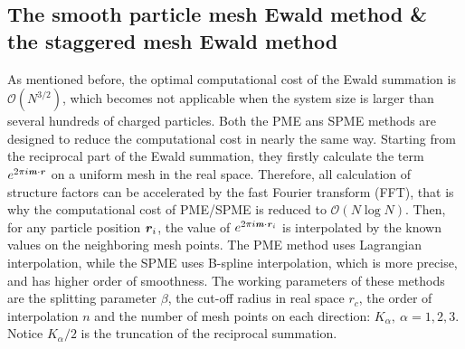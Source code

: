 \documentclass[aps,pre,preprint,unsortedaddress]{revtex4}
\renewcommand{\v}[1]{\textbf{\textit{#1}}}
\begin{document}
\subsection{The smooth particle mesh Ewald method \&
the staggered mesh Ewald method}


As mentioned before, the 
optimal computational cost of the Ewald summation
is $\mathcal O(N^{3/2})$,
which becomes not applicable when the system
size is larger than several hundreds of charged particles.
Both the PME ans SPME methods
are designed to reduce
the computational cost  in nearly the same
way.
Starting from the reciprocal part of the Ewald summation,
they firstly  calculate the term $e^{2\pi i\v m\cdot\v r}$ on a uniform
mesh in the real space.  Therefore, all calculation of structure factors
can be
accelerated by the fast Fourier transform (FFT), that is why the
computational cost of PME/SPME is reduced to $\mathcal O(N\log N)$. Then,
for any particle position $\v r_i$, the value of $e^{2\pi i\v m\cdot\v
  r_i}$ is interpolated by the known values on the neighboring mesh
points.  The PME method uses Lagrangian interpolation, while the SPME
uses B-spline interpolation,  which is more precise, and has higher order
of smoothness.
The working parameters of these methods are
the splitting parameter $\beta$,
the cut-off radius in real space $r_c$,
the order of interpolation $n$ and
the number of mesh points on each direction:  $K_\alpha,\ \alpha = 1,2,3$.
Notice $K_\alpha/2$ is the truncation
of the reciprocal summation.
\end{document}
